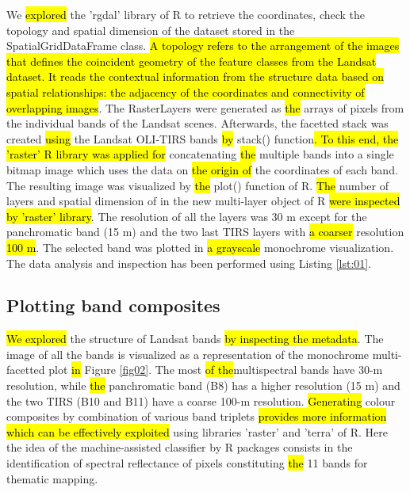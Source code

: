 \documentclass[applsci,article,submit,pdftex,moreauthors]{Definitions/mdpi}
\begin{document}
We \hl{explored} the 'rgdal' library of R to retrieve the coordinates, check the topology and spatial dimension of the dataset stored in the SpatialGridDataFrame class. \hl{A topology refers to the arrangement of the images that defines the coincident geometry of the feature classes from the Landsat dataset. It reads the contextual information from the structure data based on spatial relationships: the adjacency of the coordinates and connectivity of overlapping images}. The RasterLayers were generated as \hl{the} arrays of pixels from the individual\hl{ }bands of the Landsat scenes. Afterwards, the facetted stack was created \hl{using} the Landsat OLI-TIRS bands \hl{by} stack() function\hl{. To this end, the 'raster' R library was applied for} concatenating \hl{the} multiple bands into a single bitmap image which uses the data on \hl{the origin of} the coordinates of each band. The resulting image was visualized by \hl{the} plot() function of R. \hl{The} number of layers and spatial dimension of in the new multi-layer object of R \hl{were inspected by 'raster' library}. The resolution of all the layers was 30 m except for the panchromatic band (15 m) and the two last TIRS layers with \hl{a coarser} resolution \hl{100 m}. The selected band was plotted in \hl{a grayscale} monochrome visualization. The data analysis and inspection has been performed using Listing \ref{lst:01}.

\subsection{Plotting band composites}

\hl{We explored} the structure of Landsat bands \hl{by inspecting the metadata}. The image of all the bands is visualized as a representation of the monochrome multi-facetted plot \hl{in} Figure \ref{fig02}. The most \hl{of the}multispectral bands have 30-m resolution, while \hl{the} panchromatic band (B8) has a higher resolution (15 m) and the two TIRS (B10 and B11) have a coarse 100-m resolution. \hl{Generating} colour composites by combination of various band triplets \hl{provides more information which can be effectively exploited} using libraries 'raster' and 'terra' of R. Here the\hl{ }idea of the machine-assisted classifier by R packages consists in the identification of spectral reflectance of pixels constituting \hl{the }11 bands for thematic mapping. 
\end{document}
